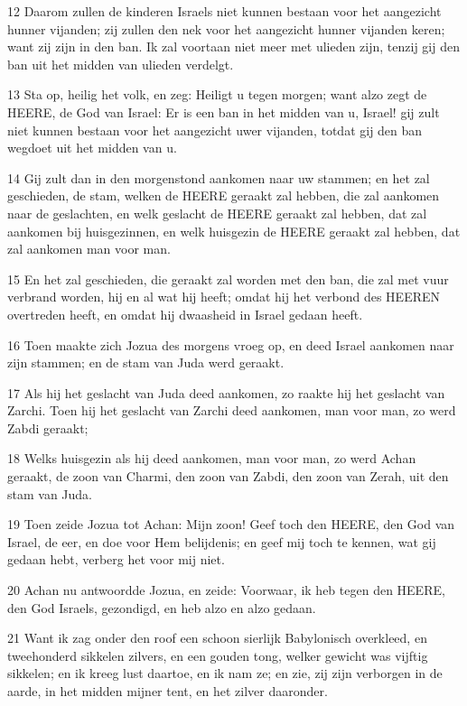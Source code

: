 \par 12 Daarom zullen de kinderen Israels niet kunnen bestaan voor het aangezicht hunner vijanden; zij zullen den nek voor het aangezicht hunner vijanden keren; want zij zijn in den ban. Ik zal voortaan niet meer met ulieden zijn, tenzij gij den ban uit het midden van ulieden verdelgt.
\par 13 Sta op, heilig het volk, en zeg: Heiligt u tegen morgen; want alzo zegt de HEERE, de God van Israel: Er is een ban in het midden van u, Israel! gij zult niet kunnen bestaan voor het aangezicht uwer vijanden, totdat gij den ban wegdoet uit het midden van u.
\par 14 Gij zult dan in den morgenstond aankomen naar uw stammen; en het zal geschieden, de stam, welken de HEERE geraakt zal hebben, die zal aankomen naar de geslachten, en welk geslacht de HEERE geraakt zal hebben, dat zal aankomen bij huisgezinnen, en welk huisgezin de HEERE geraakt zal hebben, dat zal aankomen man voor man.
\par 15 En het zal geschieden, die geraakt zal worden met den ban, die zal met vuur verbrand worden, hij en al wat hij heeft; omdat hij het verbond des HEEREN overtreden heeft, en omdat hij dwaasheid in Israel gedaan heeft.
\par 16 Toen maakte zich Jozua des morgens vroeg op, en deed Israel aankomen naar zijn stammen; en de stam van Juda werd geraakt.
\par 17 Als hij het geslacht van Juda deed aankomen, zo raakte hij het geslacht van Zarchi. Toen hij het geslacht van Zarchi deed aankomen, man voor man, zo werd Zabdi geraakt;
\par 18 Welks huisgezin als hij deed aankomen, man voor man, zo werd Achan geraakt, de zoon van Charmi, den zoon van Zabdi, den zoon van Zerah, uit den stam van Juda.
\par 19 Toen zeide Jozua tot Achan: Mijn zoon! Geef toch den HEERE, den God van Israel, de eer, en doe voor Hem belijdenis; en geef mij toch te kennen, wat gij gedaan hebt, verberg het voor mij niet.
\par 20 Achan nu antwoordde Jozua, en zeide: Voorwaar, ik heb tegen den HEERE, den God Israels, gezondigd, en heb alzo en alzo gedaan.
\par 21 Want ik zag onder den roof een schoon sierlijk Babylonisch overkleed, en tweehonderd sikkelen zilvers, en een gouden tong, welker gewicht was vijftig sikkelen; en ik kreeg lust daartoe, en ik nam ze; en zie, zij zijn verborgen in de aarde, in het midden mijner tent, en het zilver daaronder.
